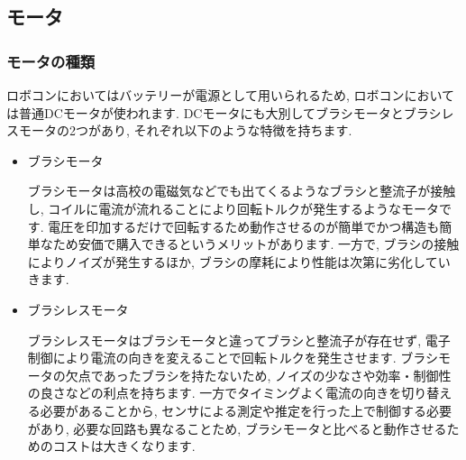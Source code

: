 \subsection{モータ}
\subsubsection{モータの種類}
ロボコンにおいてはバッテリーが電源として用いられるため, ロボコンにおいては普通DCモータが使われます. 
DCモータにも大別してブラシモータとブラシレスモータの2つがあり, それぞれ以下のような特徴を持ちます. 
\begin{itemize}
    \item ブラシモータ\par
    ブラシモータは高校の電磁気などでも出てくるようなブラシと整流子が接触し, コイルに電流が流れることにより回転トルクが発生するようなモータです. 
    電圧を印加するだけで回転するため動作させるのが簡単でかつ構造も簡単なため安価で購入できるというメリットがあります. 
    一方で, ブラシの接触によりノイズが発生するほか, ブラシの摩耗により性能は次第に劣化していきます. 
    
    \item ブラシレスモータ\par
    ブラシレスモータはブラシモータと違ってブラシと整流子が存在せず, 電子制御により電流の向きを変えることで回転トルクを発生させます. 
    ブラシモータの欠点であったブラシを持たないため, ノイズの少なさや効率・制御性の良さなどの利点を持ちます. 
    一方でタイミングよく電流の向きを切り替える必要があることから, センサによる測定や推定を行った上で制御する必要があり, 必要な回路も異なることため, ブラシモータと比べると動作させるためのコストは大きくなります. 
\end{itemize}
